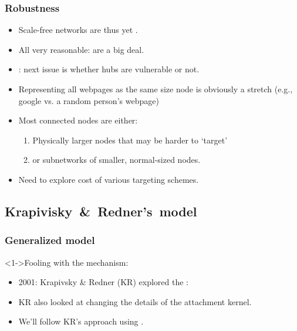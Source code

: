\begin{frame}[label=]
  \frametitle{Robustness}  

  \begin{block}{}
  \begin{itemize}
  \item<1->
    Scale-free networks are thus 
    yet .
  \item<2-> 
    All very reasonable:  are a big deal.
  \item<3-> 
    : next issue is whether hubs are vulnerable or not.
  \item<4-> 
    Representing all webpages as the same size node is obviously
    a stretch (e.g., google vs. a random person's webpage)
  \item<5-> 
    Most connected nodes are either:
    \begin{enumerate}
    \item<6->
      Physically larger nodes that may be harder to `target'
    \item<7->
      or subnetworks of smaller, normal-sized nodes.
    \end{enumerate}
  \item<8-> 
    Need to explore cost of various targeting schemes.
  \end{itemize}
  \end{block}
  
\end{frame}



\subsection{Krapivisky\ \&\ Redner's\ model}


\begin{frame}[label=]
  \frametitle{Generalized model}  

  \begin{block}<1->{Fooling with the mechanism:}
    \begin{itemize}
    \item<1->
      2001: Krapivsky \& Redner (KR)\cite{krapivsky2001a}
      explored the :
    \item<3->
      KR also looked at changing the details of
      the attachment kernel.
    \item<4->
      We'll follow KR's approach using
      .
    \end{itemize}
  \end{block}

\end{frame}

